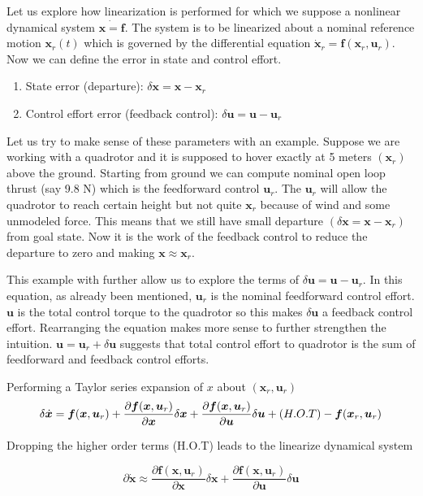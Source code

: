 \documentclass{article}
\begin{document}
Let us explore how linearization is performed for which we suppose a nonlinear dynamical system $\dot{\bm{x}=\bm{f}}$. The system is to be linearized about a nominal reference motion $\bm{x}_{r}(t)$ which is governed by the differential equation $\dot{\bm{x}}_{r} = \bm{f}(\bm{x}_{r}, \bm{u}_{r})$. Now we can define the error in state and control effort.

\begin{enumerate}
  \item State error (departure): $\delta\bm{x} = \bm{x}-\bm{x}_{r}$
  \item Control effort error (feedback control): $\delta\bm{u} = \bm{u} - \bm{u}_{r}$
\end{enumerate}

Let us try to make sense of these parameters with an example. Suppose we are working with a quadrotor and it is supposed to hover exactly at 5 meters $(\bm{x}_{r})$ above the ground. Starting from ground we can compute nominal open loop thrust (say 9.8 N) which is the feedforward control $\bm{u}_{r}$. The $\bm{u}_{r}$ will allow the quadrotor to reach certain height but not quite $\bm{x}_{r}$ because of wind and some unmodeled force. This means that we still have small departure $(\delta\bm{x} = \bm{x}-\bm{x}_{r})$ from goal state. Now it is the work of the feedback control to reduce the departure to zero and making $\bm{x}\approx \bm{x}_{r}$.

This example with further allow us to explore the terms of $\delta\bm{u} = \bm{u} - \bm{u}_{r}$. In this equation, as already been mentioned, $\bm{u}_{r}$ is the nominal feedforward control effort. $\bm{u}$ is the total control torque to the quadrotor so this makes $\delta\bm{u}$ a feedback control effort. Rearranging the equation makes more sense to further strengthen the intuition. $\bm{u}=\bm{u}_{r}+\delta\bm{u}$ suggests that total control effort to quadrotor is the sum of feedforward and feedback control efforts.


Performing a Taylor series expansion of $x$ about $(\bm{x}_{r},\bm{u}_{r})$
$$
\delta\dot{\bm{x}} = \bm{f}(\bm{x},\bm{u}_{r}) + \frac{\partial\bm{f}(\bm{x},\bm{u}_{r})}{\partial\bm{x}}\delta\bm{x} + \frac{\partial\bm{f}(\bm{x},\bm{u}_{r})}{\partial\bm{u}}\delta\bm{u} + \textnormal( H.O.T ) - \bm{f}(\bm{x}_{r},\bm{u}_{r})
$$

Dropping the higher order terms (H.O.T) leads to the linearize dynamical system

$$
\partial\dot{\bm{x}} \approx \frac{\partial\bm{f}(\bm{x},\bm{u}_{r})}{\partial\bm{x}}\delta\bm{x} + \frac{\partial\bm{f}(\bm{x},\bm{u}_{r})}{\partial\bm{u}}\delta\bm{u}
$$
\end{document}
